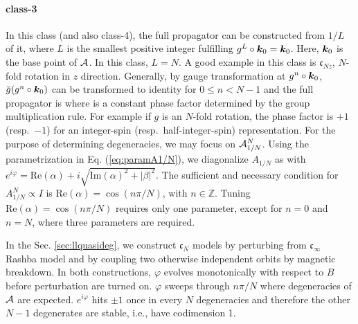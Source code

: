 \documentclass[aps, prb, showpacs, twocolumn, notitlepage, superscriptaddress]{revtex4-1}
\begin{document}
\paragraph*{class-3} In this class (and also class-4), the full propagator can be constructed from $1/L$ of it, where $L$ is the smallest positive integer fulfilling $g^L\circ \boldsymbol{k}_0=\boldsymbol{k}_0$. Here, $\boldsymbol{k}_0$ is the base point of ${\cal A}$. In this class, $L=N$. A good example in this class is $\mathfrak{c}_{Nz}$, $N$-fold rotation in $z$ direction. Generally, by gauge transformation at $g^n\circ \boldsymbol{k}_0$, $\breve{g}(g^n\circ \boldsymbol{k}_0)$ can be transformed to identity for $0 \le n < N-1$ and the full propagator is
where 
is a constant phase factor determined by the group multiplication rule. For example if $g$ is an $N$-fold rotation,  the phase factor is $+1$ (resp.\ $-1$) for an integer-spin (resp.\ half-integer-spin) representation. For the purpose of determining degeneracies, we may focus on
${\cal A}_{1/N}^N$. Using the parametrization in Eq. (\ref{eq:paramA1/N}), we diagonalize $A_{1/N}$ as 
with $e^{i\varphi}=\text{Re}(\alpha)+i\sqrt{\text{Im}(\alpha)^2+|\beta|^2}$. The sufficient and necessary condition for $A_{1/N}^N \propto I$ is $\text{Re}(\alpha)=\cos(n\pi/N)$, with $n\in\mathbb{Z}$. Tuning $\text{Re}(\alpha)=\cos(n\pi/N)$ requires only one parameter, except for $n=0$ and $n=N$, where three parameters are required.

In the Sec. \ref{sec:llquasideg}, we construct $\mathfrak{c}_N$ models by perturbing from $\mathfrak{c}_\infty$ Rashba model and by coupling two otherwise independent orbits by magnetic breakdown. In both constructions, $\varphi$ evolves monotonically with respect to $B$ before perturbation are turned on. $\varphi$ sweeps through $n\pi/N$ where degeneracies of ${\cal A}$ are expected. $e^{i\varphi}$ hits $\pm 1$ once in every $N$ degeneracies and therefore the other $N-1$ degenerates are stable, i.e., have codimension 1.
\end{document}
